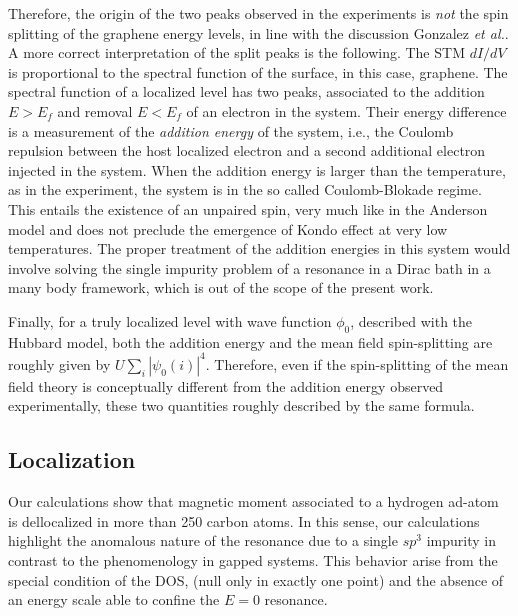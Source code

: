 Therefore, the origin of the two peaks observed in the experiments
\cite{gonzalez2016atomic} is {\em not} the spin splitting of the graphene energy levels, in line with the discussion Gonzalez {\em et al.}\cite{gonzalez2016atomic}.  A more correct interpretation of the split peaks is the following. The STM $dI/dV$ is proportional to the spectral function of the surface, in this case,  graphene. The spectral function of a localized level has two peaks,  associated to the addition $E>E_f$ and removal $E<E_f$ of an electron in the system. Their energy difference is a measurement of the {\em addition energy} of the system, i.e., the Coulomb repulsion between the host localized electron and a second additional electron injected in the system. When the addition energy is larger than the temperature, as in the experiment, the system is in the so called Coulomb-Blokade regime. This entails the existence of an unpaired spin, very much like in the Anderson model\cite{anderson1961localized} and does not preclude the emergence of Kondo effect at very low temperatures. The proper treatment of the addition energies in this system would involve solving the single impurity problem of a resonance in a Dirac bath in a many body  framework\cite{haase2011magnetic,sofo2012magnetic,mitchell13}, which is out of the scope of the present work.

Finally, for a truly localized level with wave function $\phi_0$, described with the Hubbard model,  both the addition energy and the mean field spin-splitting are roughly given by  $U\sum_i |\psi_0(i)|^4$.  Therefore,  even if the spin-splitting  of the mean field theory is conceptually different from the addition energy observed experimentally, these two quantities roughly described by the same formula.



\subsection{Localization}
Our calculations show that magnetic moment associated to a hydrogen ad-atom is dellocalized in more than 250 carbon atoms.
In this sense, our calculations highlight the anomalous nature of the resonance due to a single $sp^3$ impurity in contrast to the phenomenology in gapped systems. This behavior arise from the special condition of the DOS, (null only in exactly one point) and the absence of an energy scale able to confine the $E=0$ resonance.


